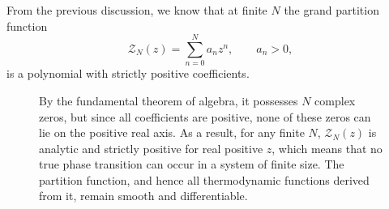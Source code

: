 From the previous discussion, we know that at finite \( N \) the grand partition function
\[
    \mathcal{Z}_N(z) = \sum_{n=0}^N a_n z^n, \qquad a_n > 0,
\]
is a polynomial with strictly positive coefficients.
\begin{figure}[H]
    \begin{minipage}[b]{0.55\textwidth}
        \begin{center}
        \end{center}
    \end{minipage}
    \hfill
    \begin{minipage}[b]{0.4\textwidth}
        By the fundamental theorem of algebra, it possesses \( N \) complex zeros, but since all coefficients are positive, none of these zeros can lie on the positive real axis. As a result, for any finite \( N \), \( \mathcal{Z}_N(z) \) is analytic and strictly positive for real positive \( z \), which means that no true phase transition can occur in a system of finite size. The partition function, and hence all thermodynamic functions derived from it, remain smooth and differentiable.
    \end{minipage}
\end{figure}


